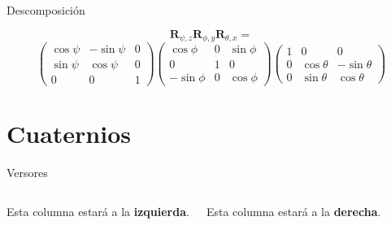 \documentclass[,ignorenonframetext,compress]{beamer}
\newcommand{\columnsbegin}{\begin{columns}}
\newcommand{\columnsend}{\end{columns}}
\begin{document}
\begin{frame}{Descomposición}

\begin{equation*}
  \mathbf{R}_{\psi,z}
  \mathbf{R}_{\phi,y}
  \mathbf{R}_{\theta,x} =
\end{equation*}\begin{equation*}
  \begin{pmatrix}
    \cos \psi & -\sin \psi & 0 \\
    \sin \psi & \cos \psi & 0 \\
    0 & 0 & 1
  \end{pmatrix}\begin{pmatrix}
      \cos \phi & 0 & \sin \phi \\
      0 & 1 & 0 \\
      -\sin \phi & 0 & \cos \phi
    \end{pmatrix}\begin{pmatrix}
    1 & 0 & 0 \\
    0 & \cos \theta & -\sin \theta \\
    0 & \sin \theta & \cos \theta
  \end{pmatrix}
\end{equation*}

\end{frame}

\section{Cuaternios}\label{cuaternios}

\begin{frame}{Versores}

\columnsbegin
{}

Esta columna estará a la \textbf{izquierda}.


Esta columna estará a la \textbf{derecha}.

\columnsend

\end{frame}
\end{document}
